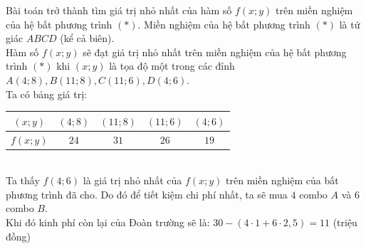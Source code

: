 \begin{bt}
{\begin{center}
		\end{center}
		Bài toán trở thành tìm giá trị nhỏ nhất của hàm số $f(x;y)$ trên miền nghiệm của hệ bất phương trình $(*)$. Miền nghiệm của hệ bất phương trình $(*)$ là tứ giác $ABCD$ (kể cả biên).\\
		Hàm số $f(x;y)$ sẽ đạt giá trị nhỏ nhất trên miền nghiệm của hệ bất phương trình $(*)$ khi $(x;y)$ là tọa độ một trong các đỉnh $A\left( 4;8 \right),B\left( 11;8 \right),C\left( 11;6 \right),D\left( 4;6 \right)$.\\
		Ta có bảng giá trị:\\
		\begin{tabular}{|c|c|c|c|c|}
			\hline
			$(x;y)$	& $(4;8)$ & $(11;8)$ & $(11;6)$ & $(4;6)$\\
			\hline
			$f(x;y)$ & $24$ & $31$ & $26$ & $19$\\
			\hline
		\end{tabular}\\
		Ta thấy $f(4;6)$ là giá trị nhỏ nhất của $f(x;y)$ trên miền nghiệm của bất phương trình đã cho. Do đó để tiết kiệm chi phí nhất, ta sẽ mua $4$ combo $A$ và $6$ combo $B$.\\
		Khi đó kinh phí còn lại của Đoàn trường sẽ là: $30-\left( 4\cdot1+6\cdot2{,}5 \right)=11$ (triệu đồng)
	}
\end{bt}

